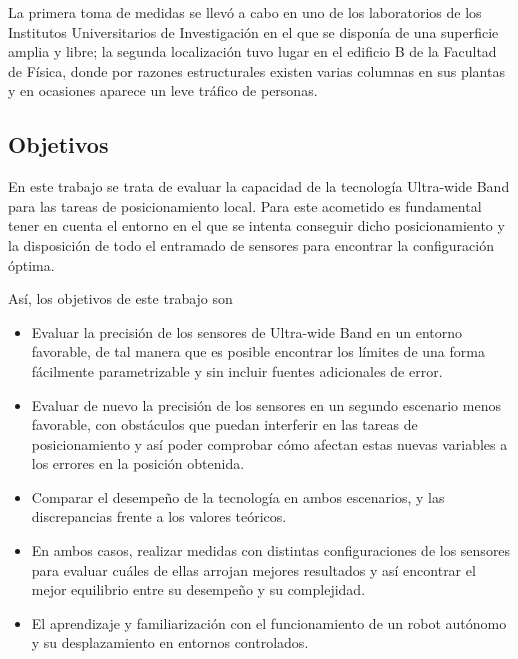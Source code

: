 La primera toma de medidas se llevó a cabo en uno de los laboratorios de los Institutos Universitarios de Investigación en el que se disponía de una superficie amplia y libre; la segunda localización tuvo lugar en el edificio B de la Facultad de Física, donde por razones estructurales existen varias columnas en sus plantas y en ocasiones aparece un leve tráfico de personas.

\subsection{Objetivos}
En este trabajo se trata de evaluar la capacidad de la tecnología Ultra-wide Band para las tareas de posicionamiento local.
Para este acometido es fundamental tener en cuenta el entorno en el que se intenta conseguir dicho posicionamiento y la disposición de todo el entramado de sensores para encontrar la configuración óptima.

Así, los objetivos de este trabajo son
\begin{itemize}
    \item Evaluar la precisión de los sensores de Ultra-wide Band en un entorno favorable, de tal manera que es posible encontrar los límites de una forma fácilmente parametrizable y sin incluir fuentes adicionales de error.
    \item Evaluar de nuevo la precisión de los sensores en un segundo escenario menos favorable, con obstáculos que puedan interferir en las tareas de posicionamiento y así poder comprobar cómo afectan estas nuevas variables a los errores en la posición obtenida.
    \item Comparar el desempeño de la tecnología en ambos escenarios, y las discrepancias frente a los valores teóricos.
    \item En ambos casos, realizar medidas con distintas configuraciones de los sensores para evaluar cuáles de ellas arrojan mejores resultados y así encontrar el mejor equilibrio entre su desempeño y su complejidad.
    \item El aprendizaje y familiarización con el funcionamiento de un robot autónomo y su desplazamiento en entornos controlados.
\end{itemize}